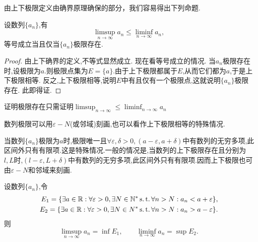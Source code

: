 由上下极限定义由确界原理确保的部分，我们容易得出下列命题.

\begin{proposition}\label{sjxxydyxjx}
    设数列$\{a_n\}$,有
    \[\limsup_{n\to\infty}a_n\leqslant\liminf_{n\to\infty}a_n,\]
    等号成立当且仅当$\{a_n\}$极限存在.
\end{proposition}

\begin{proof}
    由上下确界的定义,不等式显然成立.
    现在看等号成立的情况.
    当$a_n$极限存在时,设极限为$a$.则极限点集为$E=\{a\}$.由于上下极限都属于$E$,从而它们都为$a$,于是上下极限相等.
    反之,上下极限相等,说明$E$中有且仅有一个极限点,这就说明$\{a_n\}$极限存在.
    此即得证.
\end{proof}

\begin{note}
    证明极限存在只需证明$\limsup_{n\to\infty}\leqslant\liminf_{n\to\infty}a_n$
\end{note}

数列极限可以用$\varepsilon -N$(或邻域)刻画,也可以看作上下极限相等的特殊情况.

当数列$\{a_n\}$极限为$a$时,极限唯一且$\forall \varepsilon,\delta>0,(a-\varepsilon,a+\delta)$中有数列的无穷多项,此区间外只有有限项.这是特殊情况.一般的情况是,当数列的上下极限存在且分别为$l,L$时,$(l-\varepsilon,L+\delta)$中有数列的无穷多项,此区间外只有有限项.因而上下极限也可由$\varepsilon -N$和邻域来刻画.

\begin{theorem}\label{sxjxdy2}
    设数列$\{a_n\}$,令
    \begin{align*}E_1=\{\exists a\in\mathbb{R}:\forall\varepsilon>0,\exists N\in\mathbb{N}^*\operatorname{s.t.}\forall n>N:a_n<a+\varepsilon\},\\
    E_2=\{\exists a\in\mathbb{R}:\forall\varepsilon>0,\exists N\in N^*\operatorname{s.t.}\forall n>N:a_n>a-\varepsilon\}.\end{align*}
    则
    \[\limsup_{n\to\infty}a_n=\inf E_1,\qquad\liminf_{n\to\infty}a_n=\sup E_2.\]
\end{theorem}


